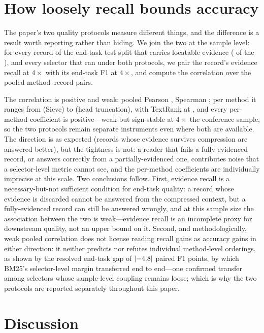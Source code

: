 \documentclass[preprint,12pt]{elsarticle}
\DeclarePairedDelimiter\abs{\lvert}{\rvert}
\theoremstyle{remark}
\newcommand{\method}{Sieve}
\begin{document}
\section{How loosely recall bounds accuracy}
\label{sec:corr}
The paper's two quality protocols measure different things, and the
difference is a result worth reporting rather than hiding. We join the
two at the sample level: for every record of the end-task test split
that carries locatable evidence (\CorrNRecs{} of the \QAN{}), and every
selector that ran under both protocols, we pair the record's evidence
recall at $4\times$ with its end-task F1 at $4\times$, and compute
the correlation over the pooled \CorrNPairs{} method--record pairs.

The correlation is positive and weak: pooled Pearson
\CorrPearson{}, Spearman \CorrSpearman{}; per method it ranges from
\CorrSiePearson{} (\method{}) to \CorrHeaPearson{} (head truncation),
with TextRank at \CorrTRPearson{}, and every per-method coefficient
is positive---weak but sign-stable at $4\times$ the conference
sample, so the two protocols remain separate instruments even where
both are available.
The direction is as expected (records whose evidence survives
compression are answered better), but the tightness is not: a
reader that fails a fully-evidenced record, or answers correctly from
a partially-evidenced one, contributes noise that a selector-level
metric cannot see, and the per-method coefficients are individually
imprecise at this scale.
Two conclusions follow. First, evidence recall is a necessary-but-not
sufficient condition for end-task quality: a record whose evidence is
discarded cannot be answered from the compressed context, but a
fully-evidenced record can still be answered wrongly, and at this
sample size the association between the two is weak---evidence recall
is an incomplete proxy for downstream quality, not an upper bound on
it. Second, and methodologically,
weak pooled correlation does not license reading recall gains as
accuracy gains in either direction: it neither predicts nor refutes
individual method-level orderings, as shown by the resolved end-task
gap of $\abs{\QAPairSBm}$ paired F1 points, by which BM25's
selector-level margin transferred end to end---one
confirmed transfer among selectors whose sample-level coupling remains
loose; which is why the two protocols are reported separately
throughout this paper.

\section{Discussion}
\label{sec:discussion}
\end{document}
